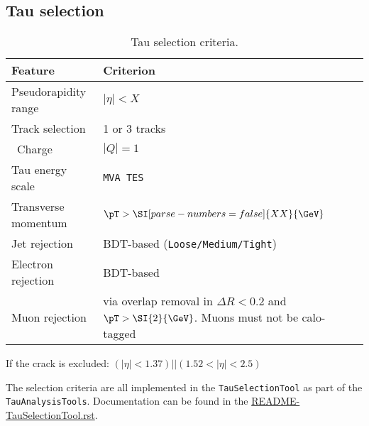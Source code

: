 \subsection{Tau selection}

\begin{table}[ht]
  \caption{Tau selection criteria.}%
  \label{tab:object:tau}
  \centering
  \begin{tabular}{ll}
  \toprule
  Feature & Criterion \\
  \midrule
  Pseudorapidity range & $|\eta| < X$ \\
  Track selection & 1 or 3 tracks \\\
  Charge & $|Q| = 1$ \\
  Tau energy scale & \texttt{MVA TES}\\
  Transverse momentum & \(\pT > \SI[parse-numbers=false]{XX}{\GeV}\) \\
  Jet rejection & BDT-based (\texttt{Loose/Medium/Tight}) \\
  Electron rejection & BDT-based\\
  Muon rejection & via overlap removal in $\Delta R < 0.2$ and \(\pT > \SI{2}{\GeV}\).
    Muons must not be calo-tagged\\
  \bottomrule
  \end{tabular}
\end{table}

If the crack is excluded: \((|\eta| < 1.37) || (1.52 < |\eta| < 2.5)\)

The selection criteria are all implemented in the \texttt{TauSelectionTool} as part of the \texttt{TauAnalysisTools}.
Documentation can be found in the \href{https://gitlab.cern.ch/atlas/athena/blob/21.2/PhysicsAnalysis/TauID/TauAnalysisTools/doc/README-TauSelectionTool.rst}{README-TauSelectionTool.rst}.

